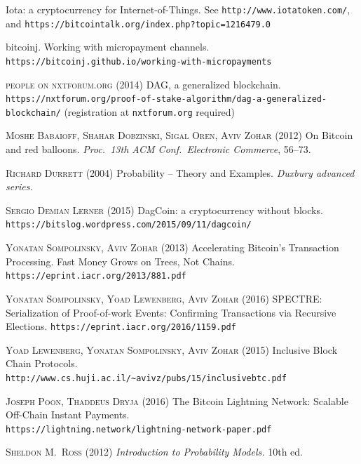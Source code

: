 \documentclass[12pt]{article}
\begin{document}
\begin{CJK}{UTF8}{bkai}
\begin{thebibliography}{9}
 Iota: a cryptocurrency for Internet-of-Things.
See \texttt{http://www.iotatoken.com/}, and
\texttt{https://bitcointalk.org/index.php?topic=1216479.0}

  bitcoinj.  
Working with micropayment channels.\\
\texttt{https://bitcoinj.github.io/working-with-micropayments}

\textsc{people on nxtforum.org}  (2014)
DAG, a generalized blockchain.
\texttt{https://nxtforum.org/proof-of-stake-algorithm/dag-a-generalized-blockchain/}  (registration at \texttt{nxtforum.org} required)

\textsc{Moshe Babaioff, Shahar Dobzinski, Sigal Oren, Aviv Zohar} (2012)
On Bitcoin and red balloons.
\textit{Proc.\ 13th ACM Conf.\ Electronic Commerce}, 56--73. 


 \textsc{Richard Durrett} (2004)
Probability -- Theory and Examples.
\textit{Duxbury advanced series.}


 \textsc{Sergio Demian Lerner} (2015)
DagCoin: a cryptocurrency without blocks.
\texttt{https://bitslog.wordpress.com/2015/09/11/dagcoin/}

 \textsc{Yonatan Sompolinsky, Aviv Zohar} (2013)
Accelerating Bitcoin's Transaction Processing.
Fast Money Grows on Trees, Not Chains.
\texttt{https://eprint.iacr.org/2013/881.pdf}

 \textsc{Yonatan Sompolinsky, Yoad Lewenberg, Aviv Zohar} (2016)
SPECTRE:
Serialization of Proof-of-work Events: Confirming Transactions via
Recursive Elections.
\texttt{https://eprint.iacr.org/2016/1159.pdf}

 \textsc{Yoad Lewenberg, Yonatan Sompolinsky, Aviv Zohar} 
(2015)
Inclusive Block Chain Protocols.\\
\texttt{http://www.cs.huji.ac.il/\textasciitilde{}avivz/pubs/15/inclusive\underline{\phantom{m}}btc.pdf}

\textsc{Joseph Poon, Thaddeus Dryja} (2016)
The Bitcoin Lightning Network:
Scalable Off-Chain Instant Payments.\\
\texttt{https://lightning.network/lightning-network-paper.pdf}

 \textsc{Sheldon M.\ Ross} (2012) 
\textit{Introduction to Probability Models.} 10th ed.


\end{thebibliography}
\end{CJK}
\end{document}
